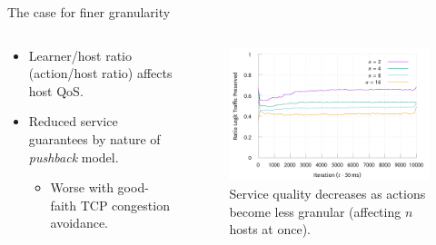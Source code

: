 \documentclass[aspectratio=169,xcolor={dvipsnames}
,hide notes
]{beamer}
\begin{document}
\begin{frame}{The case for finer granularity}
	\begin{columns}
	\begin{column}{0.45\linewidth}
		\begin{itemize}
			\item Learner/host ratio (action/host ratio) affects host QoS.
			
			\item Reduced service guarantees by nature of \emph{pushback} model.
			\begin{itemize}
				\item \alert{Worse with good-faith TCP congestion avoidance}.
			\end{itemize}
			
		\end{itemize}
	\end{column}
	\begin{column}{0.5\linewidth}
		\begin{figure}
			\includegraphics[width=\linewidth]{../plots/online-varyN-binary-pres.pdf}
			\caption{Service quality decreases as actions become less granular (affecting $n$ hosts at once).}
		\end{figure}
	\end{column}
	\end{columns}
\end{frame}
\end{document}
